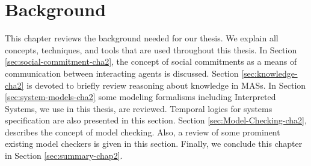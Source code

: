 \setcounter{chapter}{1}

\chapter{Background}\label{cha:background}
This chapter reviews the background needed for our thesis. We explain all concepts, techniques, and tools that are used throughout this thesis. In Section \ref{sec:social-commitment-cha2}, the concept of social commitments as a means of communication between interacting agents is discussed. Section \ref{sec:knowledge-cha2} is devoted to briefly review reasoning about knowledge in MASs. In Section \ref{sec:system-models-cha2} some modeling formalisms including Interpreted Systems, we use in this thesis, are reviewed. Temporal logics for systems specification are also presented in this section. Section \ref{sec:Model-Checking-cha2}, describes the concept of model checking. Also, a review of some prominent existing model checkers is given in this section. Finally, we conclude this chapter in Section \ref{sec:summary-chap2}.


